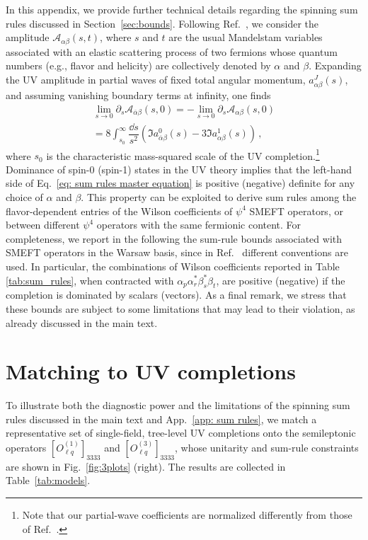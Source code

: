\documentclass[
aps,
prd,
10pt,
twocolumn,
oneside,
preprintnumbers,
superscriptaddress,
amsmath,
amssymb,
nofootinbib,
flushbottom]{revtex4-2}
\begin{document}
In this appendix, we provide further technical details regarding the spinning sum rules discussed in Section~\ref{sec:bounds}. Following Ref.~\cite{Remmen:2020uze}, we consider the amplitude $\mathcal{A}_{\alpha\beta}(s,t)$, where $s$ and $t$ are the usual Mandelstam variables associated with an elastic scattering process of
two fermions whose quantum numbers (e.g., flavor and helicity) are collectively denoted by $\alpha$ and $\beta$.
Expanding the UV amplitude in partial waves of fixed total angular momentum, $a_{\alpha\beta}^{J}(s)$, and 
assuming vanishing boundary terms at infinity, one finds \cite{Remmen:2020uze}
%
\begin{multline}\label{eq: sum rules master equation}
    \lim_{s\rightarrow 0}\partial_s\mathcal{A}_{\overline \alpha\beta}(s,0) = -\lim_{s\rightarrow 0}\partial_s\mathcal{A}_{ \alpha\beta}(s,0) \\=8\int_{s_0}^\infty \dfrac{\dd s}{s^2}\left(\Im a_{\overline{\alpha}\beta}^{0}(s)-3\Im a_{\alpha\beta}^{1}(s)\right)\,,
\end{multline}
where $s_0$ is the characteristic mass-squared scale of the UV completion.\footnote{Note that our partial-wave coefficients are normalized differently from those of Ref.~\cite{Remmen:2020uze}.}
Dominance of spin-0 (spin-1) states in the UV theory implies that the left-hand side of Eq.~\eqref{eq: sum rules master equation} is positive (negative) definite for any choice of $\alpha$ and $\beta$.
This property can be exploited to derive sum rules among the flavor-dependent entries of the Wilson coefficients of $\psi^4$ SMEFT operators, or between different $\psi^4$ operators with the same fermionic content. For completeness, we report in the following the sum-rule bounds associated with SMEFT operators in the Warsaw basis, since in Ref.~\cite{Remmen:2020uze} different conventions are used.
In particular, the combinations of Wilson coefficients reported in Table \ref{tab:sum_rules}, when contracted with $\alpha_p \alpha_r^* \beta^*_s \beta_t$, are positive (negative) if the completion is dominated by scalars (vectors).
As a final remark, we stress that these bounds are subject to some limitations that may lead to their violation, as already discussed in the main text.

\section{Matching to UV completions\label{app:UV}}

To illustrate both the diagnostic power and the limitations of the spinning sum
rules discussed in the main text and App.~\ref{app: sum rules}, we match a
representative set of single-field, tree-level UV completions \cite{deBlas:2017xtg}
onto the semileptonic operators $[O_{\ell q}^{(1)}]_{3333}$ and
$[O_{\ell q}^{(3)}]_{3333}$, whose unitarity and sum-rule constraints are shown in
Fig.~\ref{fig:3plots} (right). The results are collected in Table~\ref{tab:models}.
\end{document}
